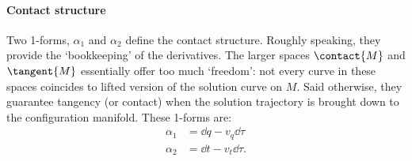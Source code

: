 \paragraph{Contact structure} Two 1-forms, $\alpha_1$ and $\alpha_2$ define the contact structure. Roughly speaking, they provide the `bookkeeping' of the derivatives. The larger spaces $\contact{M}$ and $\tangent{M}$ essentially offer too much `freedom': not every curve in these spaces coincides to lifted version of the solution curve on $M$. Said otherwise, they guarantee tangency (or contact) when the solution trajectory is brought down to the configuration manifold. These 1-forms are:
    \begin{equation} 
        \begin{split}
            \alpha_1 &= \dd{q} - v_q\dd{\tau}\\
            \alpha_2 &= \dd{t} - v_t\dd{\tau}.
        \end{split}
    \end{equation}
